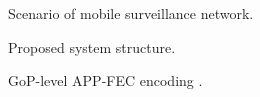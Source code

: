 \documentclass[journal]{IEEEtran}
\begin{document}
\begin{figure}[t]
\vspace{-.06in}
\caption{Scenario of mobile surveillance network.}
\label{fig:scenario}
\end{figure}

\begin{figure}[t]
\caption{Proposed system structure.}
\label{fig:system}
\end{figure}

\begin{figure}[t]
\caption{GoP-level APP-FEC encoding \cite{WSHZ13}.}
\label{fig:GOP_FEC}
\end{figure}
\end{document}
